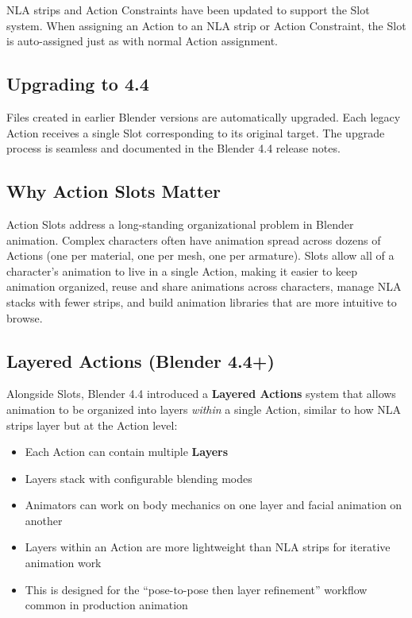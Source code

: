 NLA strips and Action Constraints have been updated to support the Slot system. When assigning an Action to an NLA strip or Action Constraint, the Slot is auto-assigned just as with normal Action assignment.

\subsection{Upgrading to 4.4}

Files created in earlier Blender versions are automatically upgraded. Each legacy Action receives a single Slot corresponding to its original target. The upgrade process is seamless and documented in the Blender 4.4 release notes.

\subsection{Why Action Slots Matter}

Action Slots address a long-standing organizational problem in Blender animation. Complex characters often have animation spread across dozens of Actions (one per material, one per mesh, one per armature). Slots allow all of a character's animation to live in a single Action, making it easier to keep animation organized, reuse and share animations across characters, manage NLA stacks with fewer strips, and build animation libraries that are more intuitive to browse.

\subsection{Layered Actions (Blender 4.4+)}

Alongside Slots, Blender 4.4 introduced a \textbf{Layered Actions} system that allows animation to be organized into layers \textit{within} a single Action, similar to how NLA strips layer but at the Action level:

\begin{itemize}[leftmargin=2em]
  \item Each Action can contain multiple \textbf{Layers}
  \item Layers stack with configurable blending modes
  \item Animators can work on body mechanics on one layer and facial animation on another
  \item Layers within an Action are more lightweight than NLA strips for iterative animation work
  \item This is designed for the ``pose-to-pose then layer refinement'' workflow common in production animation
\end{itemize}


